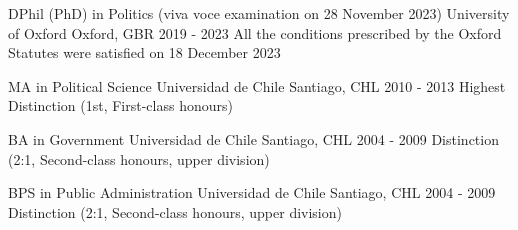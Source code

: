 





\begin{cventries}

\vspace{0.5mm}
\cventry
{DPhil (PhD) in Politics (viva voce examination on 28 November 2023)} 
{University of Oxford} 
{Oxford, GBR} 
{2019 - 2023} 
{All the conditions prescribed by the Oxford Statutes were satisfied on 18 December 2023}\vspace{1.5mm}

\cventry
{MA in Political Science} 
{Universidad de Chile} 
{Santiago, CHL} 
{2010 - 2013} 
{Highest Distinction (1st, First-class honours)} \vspace{1.5mm}

\cventry
{BA in Government} 
{Universidad de Chile} 
{Santiago, CHL} 
{2004 - 2009} 
{Distinction (2:1, Second-class honours, upper division)} \vspace{1.5mm}

\cventry
{BPS in Public Administration} 
{Universidad de Chile} 
{Santiago, CHL} 
{2004 - 2009} 
{Distinction (2:1, Second-class honours, upper division)}\vspace{1.5mm}

\end{cventries}
